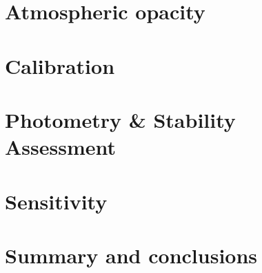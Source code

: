\documentclass[traditionalabstract]{aa}
\begin{document}
\section{Atmospheric opacity}
\label{se:opacity}


\section{Calibration}
\label{se:calibration}



\section{Photometry \& Stability Assessment}
\label{se:photometry}


\section{Sensitivity}
\label{se:sensitivity}



\section{Summary and conclusions}
\label{se:summary}
\end{document}
